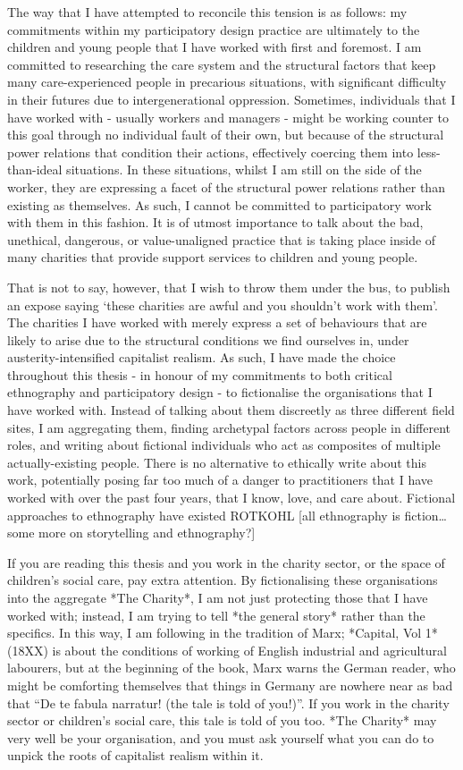 The way that I have attempted to reconcile this tension is as follows: my commitments within my participatory design practice are ultimately to the children and young people that I have worked with first and foremost. I am committed to researching the care system and the structural factors that keep many care-experienced people in precarious situations, with significant difficulty in their futures due to intergenerational oppression. Sometimes, individuals that I have worked with - usually workers and managers - might be working counter to this goal through no individual fault of their own, but because of the structural power relations that condition their actions, effectively coercing them into less-than-ideal situations. In these situations, whilst I am still on the side of the worker, they are expressing a facet of the structural power relations rather than existing as themselves. As such, I cannot be committed to participatory work with them in this fashion. It is of utmost importance to talk about the bad, unethical, dangerous, or value-unaligned practice that is taking place inside of many charities that provide support services to children and young people.

That is not to say, however, that I wish to throw them under the bus, to publish an expose saying ‘these charities are awful and you shouldn’t work with them’. The charities I have worked with merely express a set of behaviours that are likely to arise due to the structural conditions we find ourselves in, under austerity-intensified capitalist realism. As such, I have made the choice throughout this thesis - in honour of my commitments to both critical ethnography and participatory design - to fictionalise the organisations that I have worked with. Instead of talking about them discreetly as three different field sites, I am aggregating them, finding archetypal factors across people in different roles, and writing about fictional individuals who act as composites of multiple actually-existing people. There is no alternative to ethically write about this work, potentially posing far too much of a danger to practitioners that I have worked with over the past four years, that I know, love, and care about. Fictional approaches to ethnography have existed ROTKOHL [all ethnography is fiction… some more on storytelling and ethnography?]

If you are reading this thesis and you work in the charity sector, or the space of children’s social care, pay extra attention. By fictionalising these organisations into the aggregate *The Charity*, I am not just protecting those that I have worked with; instead, I am trying to tell *the general story* rather than the specifics. In this way, I am following in the tradition of Marx;  *Capital, Vol 1* (18XX) is about the conditions of working of English industrial and agricultural labourers, but at the beginning of the book, Marx warns the German reader, who might be comforting themselves that things in Germany are nowhere near as bad that “De te fabula narratur! (the tale is told of you!)”.  If you work in the charity sector or children’s social care, this tale is told of you too. *The Charity* may very well be your organisation, and you must ask yourself what you can do to unpick the roots of capitalist realism within it. 


